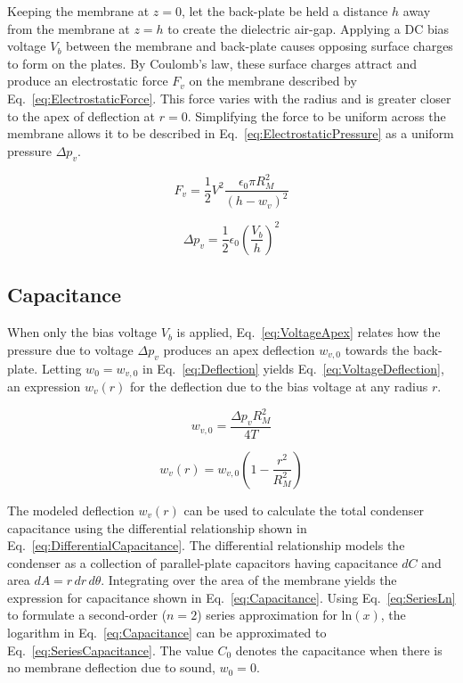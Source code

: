 \documentclass[journal]{IEEEtran}
\begin{document}
Keeping the membrane at $z=0$, let the back-plate be held a distance $h$ away from the membrane at $z=h$ to create the dielectric air-gap. Applying a DC bias voltage $V_b$ between the membrane and back-plate causes opposing surface charges to form on the plates. By Coulomb's law, these surface charges attract and produce an electrostatic force $F_v$ on the membrane described by Eq.~\ref{eq:ElectrostaticForce}.\supercite{aip} This force varies with the radius and is greater closer to the apex of deflection at $r=0$. Simplifying the force to be uniform across the membrane allows it to be described in Eq.~\ref{eq:ElectrostaticPressure} as a uniform pressure $\Delta p_v$.\supercite{aip}

\begin{figure}[ht]
	\begin{equation}
		F_v = \frac{1}{2}V^2\frac{\epsilon_0\pi R_M^2}{(h-w_v)^2}
		\label{eq:ElectrostaticForce}
	\end{equation}

	\begin{equation}
		\Delta p_v = \frac{1}{2}\epsilon_0\left(\frac{V_b}{h}\right)^2
		\label{eq:ElectrostaticPressure}
	\end{equation}
\end{figure}

\subsection{Capacitance}

When only the bias voltage $V_b$ is applied, Eq.~\ref{eq:VoltageApex} relates how the pressure due to voltage $\Delta p_v$ produces an apex deflection $w_{v,0}$ towards the back-plate.\supercite{aip} Letting $w_0=w_{v,0}$ in Eq.~\ref{eq:Deflection} yields Eq.~\ref{eq:VoltageDeflection}, an expression $w_v(r)$ for the deflection due to the bias voltage at any radius $r$.

\begin{figure}[ht]
	\begin{equation}
		w_{v,0} = \frac{\Delta p_v R_M^2}{4T}
		\label{eq:VoltageApex}
	\end{equation}
	
	\begin{equation}
		w_v(r) = w_{v,0}\left(1-\frac{r^2}{R_M^2}\right)
		\label{eq:VoltageDeflection}
	\end{equation}
\end{figure}

The modeled deflection $w_v(r)$ can be used to calculate the total condenser capacitance using the differential relationship shown in Eq.~\ref{eq:DifferentialCapacitance}. The differential relationship models the condenser as a collection of parallel-plate capacitors having capacitance $dC$ and area $dA=r\,dr\,d\theta$. Integrating over the area of the membrane yields the expression for capacitance shown in Eq.~\ref{eq:Capacitance}. Using Eq.~\ref{eq:SeriesLn} to formulate a second-order ($n=2$) series approximation for $\mathrm{ln}(x)$, the logarithm in Eq.~\ref{eq:Capacitance} can be approximated to Eq.~\ref{eq:SeriesCapacitance}.\supercite{aip} The value $C_0$ denotes the capacitance when there is no membrane deflection due to sound, $w_0=0$.
\end{document}
